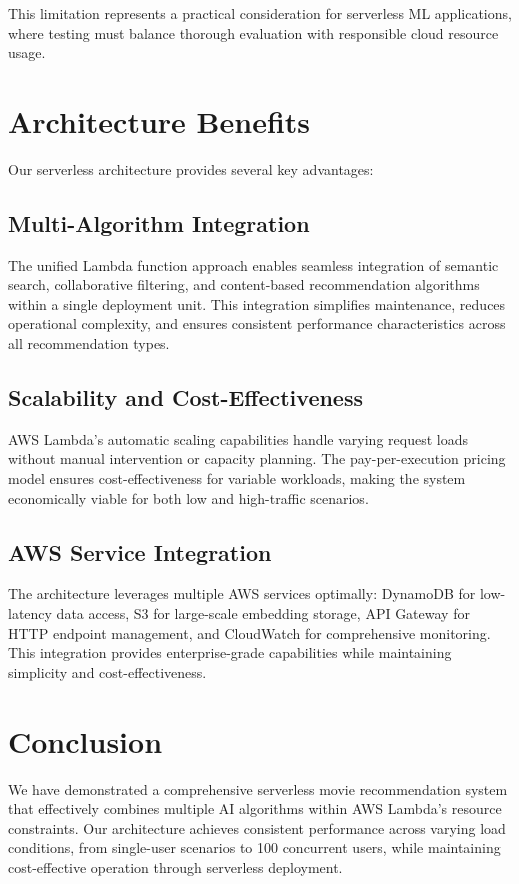 \documentclass[conference]{IEEEtran}
\begin{document}
This limitation represents a practical consideration for serverless ML applications, where testing must balance thorough evaluation with responsible cloud resource usage.

\section{Architecture Benefits}

Our serverless architecture provides several key advantages:

\subsection{Multi-Algorithm Integration}

The unified Lambda function approach enables seamless integration of semantic search, collaborative filtering, and content-based recommendation algorithms within a single deployment unit. This integration simplifies maintenance, reduces operational complexity, and ensures consistent performance characteristics across all recommendation types.

\subsection{Scalability and Cost-Effectiveness}

AWS Lambda's automatic scaling capabilities handle varying request loads without manual intervention or capacity planning. The pay-per-execution pricing model ensures cost-effectiveness for variable workloads, making the system economically viable for both low and high-traffic scenarios.

\subsection{AWS Service Integration}

The architecture leverages multiple AWS services optimally: DynamoDB for low-latency data access, S3 for large-scale embedding storage, API Gateway for HTTP endpoint management, and CloudWatch for comprehensive monitoring. This integration provides enterprise-grade capabilities while maintaining simplicity and cost-effectiveness.

\section{Conclusion}

We have demonstrated a comprehensive serverless movie recommendation system that effectively combines multiple AI algorithms within AWS Lambda's resource constraints. Our architecture achieves consistent performance across varying load conditions, from single-user scenarios to 100 concurrent users, while maintaining cost-effective operation through serverless deployment.
\end{document}
